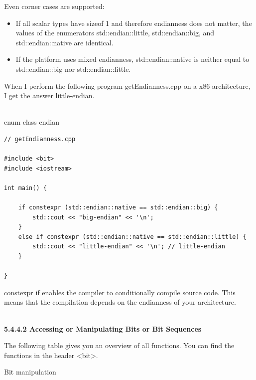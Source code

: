 Even corner cases are supported:

\begin{itemize}
\item 
If all scalar types have sizeof 1 and therefore endianness does not matter, the values of the enumerators std::endian::little, std::endian::big, and std::endian::native are identical.

\item 
If the platform uses mixed endianness, std::endian::native is neither equal to std::endian::big nor std::endian::little.
\end{itemize}

When I perform the following program getEndianness.cpp on a x86 architecture, I get the answer little-endian.

\hspace*{\fill} \\ %
\noindent
enum class endian
\begin{lstlisting}[style=styleCXX]
// getEndianness.cpp

#include <bit>
#include <iostream>

int main() {
	
	if constexpr (std::endian::native == std::endian::big) {
		std::cout << "big-endian" << '\n';
	}
	else if constexpr (std::endian::native == std::endian::little) {
		std::cout << "little-endian" << '\n'; // little-endian
	}

}
\end{lstlisting}

constexpr if enables the compiler to conditionally compile source code. This means that the compilation depends on the endianness of your architecture.

\hspace*{\fill} \\ %
\noindent
\textbf{5.4.4.2\hspace{0.2cm} Accessing or Manipulating Bits or Bit Sequences}

The following table gives you an overview of all functions. You can find the functions in the header <bit>.

\begin{center}
Bit manipulation
\end{center}

